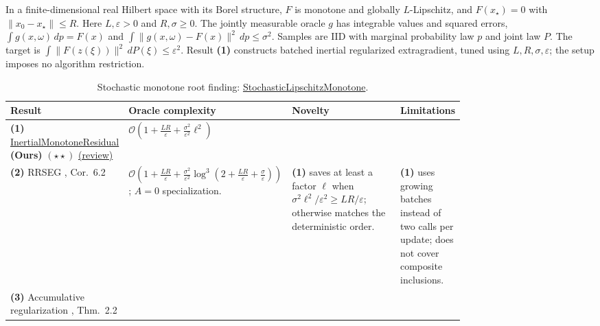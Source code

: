 \begin{table}[tp]
\centering
\caption{Stochastic monotone root finding: \href{https://github.com/k3nfalt/longtails/blob/main/LongTails/Setups/StochasticLipschitzMonotone.lean}{StochasticLipschitzMonotone}.}\label{tab:StochasticLipschitzMonotone}
\parbox{\linewidth}{\footnotesize In a finite-dimensional real Hilbert space with its Borel structure, $F$ is monotone and globally $L$-Lipschitz, and $F(x_\star)=0$ with $\|x_0-x_\star\|\le R$. Here $L,\varepsilon>0$ and $R,\sigma\ge0$. The jointly measurable oracle $g$ has integrable values and squared errors, $\int g(x,\omega)\,dp=F(x)$ and $\int\|g(x,\omega)-F(x)\|^2\,dp\le\sigma^2$. Samples are IID with marginal probability law $p$ and joint law $P$. The target is $\int\|F(z(\xi))\|^2\,dP(\xi)\le\varepsilon^2$. Result \textbf{(1)} constructs batched inertial regularized extragradient, tuned using $L,R,\sigma,\varepsilon$; the setup imposes no algorithm restriction.}\par\smallskip
\begin{threeparttable}
\footnotesize
\setlength{\tabcolsep}{4pt}\renewcommand{\arraystretch}{1.25}
\begin{tabularx}{\linewidth}{@{}>{\raggedright\arraybackslash}p{0.20\linewidth}>{\raggedright\arraybackslash}p{0.32\linewidth}>{\raggedright\arraybackslash}p{0.25\linewidth}>{\raggedright\arraybackslash}X@{}}
\toprule
\textbf{Result} & \textbf{Oracle complexity} & \textbf{Novelty} & \textbf{Limitations} \\
\midrule
\textbf{(1)} \href{https://github.com/k3nfalt/longtails/blob/main/LongTails/Theorems/InertialMonotoneResidual.lean}{Inertial\allowbreak Monotone\allowbreak Residual} \textbf{(Ours)} $(\star\star)$ \href{https://github.com/k3nfalt/longtails/blob/main/scripts/reviews/InertialMonotoneResidual.md}{(review)}
& $\mathcal{O}\!\left(1+\frac{LR}{\varepsilon}+\frac{\sigma^2}{\varepsilon^2}\ell^2\right)$ & & \\
\midrule[1.2pt]
\textbf{(2)} RRSEG \citep{slmLeeKim2026}, Cor.~6.2
& $\mathcal{O}\!\left(1+\frac{LR}{\varepsilon}+\frac{\sigma^2}{\varepsilon^2}\log^3(2+\frac{LR}{\varepsilon}+\frac{\sigma}{\varepsilon})\right)$; $A=0$ specialization.
& \textbf{(1)} saves at least a factor $\ell$ when $\sigma^2\ell^2/\varepsilon^2\ge LR/\varepsilon$; otherwise matches the deterministic order.
& \textbf{(1)} uses growing batches instead of two calls per update; does not cover composite inclusions. \\
\midrule
\textbf{(3)} Accumulative regularization \citep{slmJiLanZhu2026}, Thm.~2.2

\end{tabularx}
\end{threeparttable}
\end{table}
